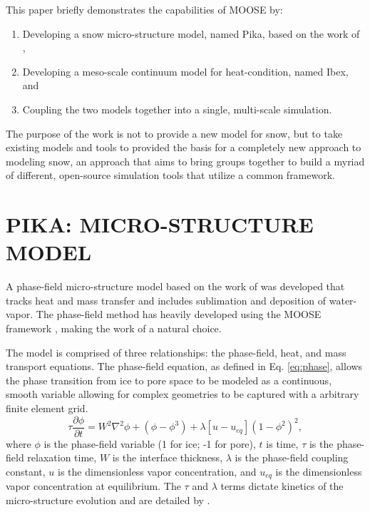 This paper briefly demonstrates the capabilities of MOOSE by:
\begin{enumerate}
\item Developing a snow micro-structure model, named Pika, based on the work of \citet{kaempfer2009phase},
\item Developing a meso-scale continuum model for heat-condition, named Ibex, and
\item Coupling the two models together into a single, multi-scale simulation.
\end{enumerate}

The purpose of the work is not to provide a new model for snow, but to take existing models and tools to provided the basis for a completely new approach to modeling snow, an approach that aims to bring groups together to build a myriad of different, open-source simulation tools that utilize a common framework.

\section{PIKA: MICRO-STRUCTURE MODEL}\label{sec:pika}
A phase-field micro-structure model based on the work of \citet{kaemfer2009phase} was developed that tracks heat and mass transfer and includes sublimation and deposition of water-vapor. The phase-field method has heavily developed using the MOOSE framework \citep{tonks2012object}, making the work of \citet{kaempfer2009phase} a natural choice.

The model is comprised of three relationships: the phase-field, heat, and mass transport equations. The phase-field equation, as defined in Eq. \eqref{eq:phase}, allows the phase transition from ice to pore space to be modeled as a continuous, smooth variable allowing for complex geometries to be captured with a arbitrary finite element grid.
\begin{equation}\label{eq:phase}
\tau \frac{\partial \phi}{\partial t} = W^2 \nabla^2 \phi +(\phi-\phi^3)+\lambda[u-u_{eq}](1-\phi^2)^2,
\end{equation}
where $\phi$ is the phase-field variable (1 for ice; -1 for pore), $t$ is time, $\tau$ is the phase-field relaxation time, $W$ is the interface thickness, $\lambda$ is the phase-field coupling constant, $u$ is the dimensionless vapor concentration, and $u_{eq}$ is the dimensionless vapor concentration at equilibrium. The $\tau$ and $\lambda$ terms dictate kinetics of the micro-structure evolution and are detailed by \citet{kaempfer2009phase}.

